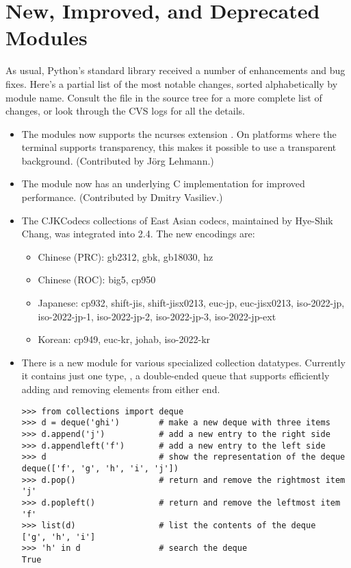 \documentclass{howto}
\begin{document}
\section{New, Improved, and Deprecated Modules}

As usual, Python's standard library received a number of enhancements and
bug fixes.  Here's a partial list of the most notable changes, sorted
alphabetically by module name. Consult the
 file in the source tree for a more
complete list of changes, or look through the CVS logs for all the
details.

\begin{itemize}

\item The  modules now supports the ncurses extension 
   .  On platforms where the terminal
   supports transparency, this makes it possible to use a transparent
   background.  (Contributed by J\"org Lehmann.)

\item The  module now has an underlying C implementation
   for improved performance.
   (Contributed by Dmitry Vasiliev.)

\item The CJKCodecs collections of East Asian codecs, maintained
by Hye-Shik Chang, was integrated into 2.4.  
The new encodings are:

\begin{itemize}
 \item Chinese (PRC): gb2312, gbk, gb18030, hz
 \item Chinese (ROC): big5, cp950
 \item Japanese: cp932, shift-jis, shift-jisx0213, euc-jp,
euc-jisx0213, iso-2022-jp, iso-2022-jp-1, iso-2022-jp-2,
 iso-2022-jp-3, iso-2022-jp-ext
 \item Korean: cp949, euc-kr, johab, iso-2022-kr
\end{itemize} 

\item There is a new  module for 
   various specialized collection datatypes.  
   Currently it contains just one type, , 
   a double-ended queue that supports efficiently adding and removing
   elements from either end.

\begin{verbatim}
>>> from collections import deque
>>> d = deque('ghi')        # make a new deque with three items
>>> d.append('j')           # add a new entry to the right side
>>> d.appendleft('f')       # add a new entry to the left side
>>> d                       # show the representation of the deque
deque(['f', 'g', 'h', 'i', 'j'])
>>> d.pop()                 # return and remove the rightmost item
'j'
>>> d.popleft()             # return and remove the leftmost item
'f'
>>> list(d)                 # list the contents of the deque
['g', 'h', 'i']
>>> 'h' in d                # search the deque
True  
\end{verbatim}


\end{itemize}
\end{document}
